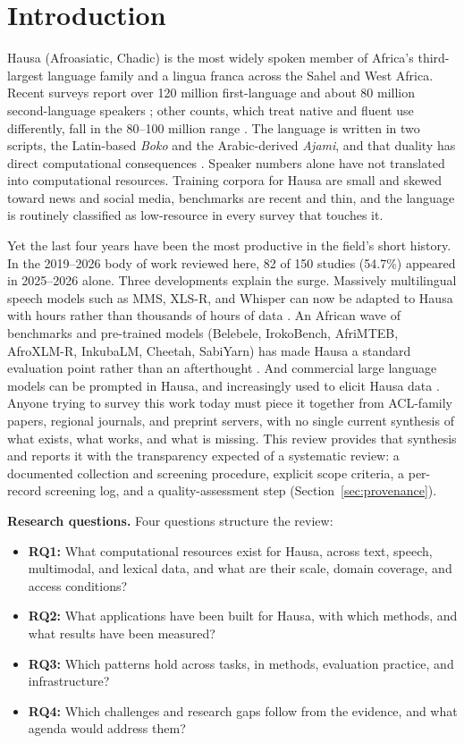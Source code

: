 \documentclass[sn-basic,pdflatex]{sn-jnl}
\begin{document}
\section{Introduction}\label{sec:intro}
Hausa (Afroasiatic, Chadic) is the most widely spoken member of Africa's third-largest language family and a lingua franca across the Sahel and West Africa. Recent surveys report over 120 million first-language and about 80 million second-language speakers \citep{p005}; other counts, which treat native and fluent use differently, fall in the 80--100 million range \citep{p007}. The language is written in two scripts, the Latin-based \emph{Boko} and the Arabic-derived \emph{Ajami}, and that duality has direct computational consequences \citep{p002}. Speaker numbers alone have not translated into computational resources. Training corpora for Hausa are small and skewed toward news and social media, benchmarks are recent and thin, and the language is routinely classified as low-resource in every survey that touches it.

Yet the last four years have been the most productive in the field's short history. In the 2019--2026 body of work reviewed here, 82 of 150 studies (54.7\%) appeared in 2025--2026 alone. Three developments explain the surge. Massively multilingual speech models such as MMS, XLS-R, and Whisper can now be adapted to Hausa with hours rather than thousands of hours of data \citep{p001,p044}. An African wave of benchmarks and pre-trained models (Belebele, IrokoBench, AfriMTEB, AfroXLM-R, InkubaLM, Cheetah, SabiYarn) has made Hausa a standard evaluation point rather than an afterthought \citep{p012,p013,p016,p094,p100,p101,p102}. And commercial large language models can be prompted in Hausa, and increasingly used to elicit Hausa data \citep{p024,p033}. Anyone trying to survey this work today must piece it together from ACL-family papers, regional journals, and preprint servers, with no single current synthesis of what exists, what works, and what is missing. This review provides that synthesis and reports it with the transparency expected of a systematic review: a documented collection and screening procedure, explicit scope criteria, a per-record screening log, and a quality-assessment step (Section~\ref{sec:provenance}).

\medskip
\noindent\textbf{Research questions.} Four questions structure the review:
\begin{itemize}\itemsep2pt
  \item \textbf{RQ1:} What computational resources exist for Hausa, across text, speech, multimodal, and lexical data, and what are their scale, domain coverage, and access conditions?
  \item \textbf{RQ2:} What applications have been built for Hausa, with which methods, and what results have been measured?
  \item \textbf{RQ3:} Which patterns hold across tasks, in methods, evaluation practice, and infrastructure?
  \item \textbf{RQ4:} Which challenges and research gaps follow from the evidence, and what agenda would address them?
\end{itemize}
\end{document}
